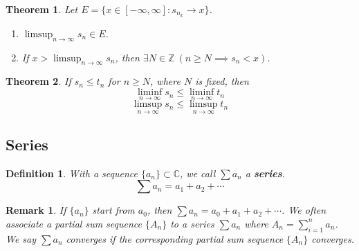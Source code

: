 \documentclass[aps,pra,onecolumn,notitlepage,superscriptaddress]{revtex4-1}
\newcommand{\Z}{\mathbb{Z}}
\newcommand{\C}{\mathbb{C}}
\newtheorem{theo}{Theorem}
\newtheorem{defi}{Definition}
\newtheorem{rem}{Remark}
\begin{document}
    \begin{theo}
        Let $E = \{ x \in [-\infty, \infty] : s_{n_k} \to x \}$. 
        \begin{enumerate}
            \item $\limsup_{n \to \infty} s_n \in E$.
            \item If $x > \limsup_{n \to \infty} s_n$, then $\exists N \in \Z \ \left( n \geq N \implies s_n < x \right)$.
        \end{enumerate}
    \end{theo}

    \begin{theo}
        If $s_n \leq t_n$ for $n \geq N$, where $N$ is fixed, then
        \begin{equation}
            \liminf_{n \to \infty} s_n \leq \liminf_{n \to \infty} t_n
        \end{equation}
        \begin{equation}
            \limsup_{n \to \infty} s_n \leq \limsup_{n \to \infty} t_n
        \end{equation}
    \end{theo}

    \subsection{Series}
    \begin{defi}
        With a sequence $\{ a_n \} \subset \C$, we call $\sum a_n$ a \textbf{series}.
        \begin{equation}
            \sum a_n = a_1 + a_2 + \cdots
        \end{equation}
    \end{defi}

    \begin{rem}
        If $\{ a_n \}$ start from $a_0$, then $\sum a_n = a_0 + a_1 + a_2 + \cdots$. We often associate a partial sum sequence $\{A_n\}$ to a series $\sum a_n$ where $A_n = \sum_{i=1}^n a_n$. We say $\sum a_n$ converges if the corresponding partial sum sequence $\{A_n\}$ converges.
    \end{rem}
\end{document}
